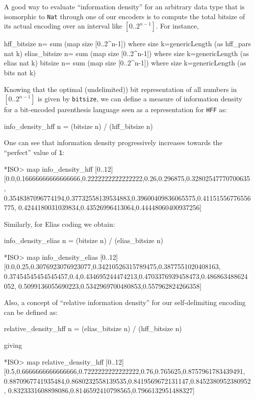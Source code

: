 \documentclass[]{INCLUDES/llncs}
\begin{document}
A good way to evaluate ``information density'' for an arbitrary
data type that is isomorphic to {\tt Nat} through one of our encoders
is to compute the total bitsize of its actual encoding over an
interval like $[0..2^{n-1}]$. For instance,
\begin{code}
hff_bitsize n= sum (map size [0..2^n-1]) where
   size k=genericLength (as hff_pars nat k) 
elias_bitsize n= sum (map size [0..2^n-1]) where
   size k=genericLength (as elias nat k)    
bitsize n= sum (map size [0..2^n-1]) where
   size k=genericLength (as bits nat k)    
\end{code}
Knowing that the optimal (undelimited)) bit representation of all numbers in
$[0..2^{n-1}]$ is given by {\tt bitsize}, we can define a measure of information
density for a bit-encoded parenthesis language seen as a representation for {\tt HFF} as:
\begin{code}
info_density_hff n = (bitsize n) / (hff_bitsize n)
\end{code}
One can see that information density progressively increases towards the
``perfect'' value of {\tt 1}:
\begin{codex}
*ISO> map info_density_hff [0..12]
[0.0,0.16666666666666666,0.2222222222222222,0.26,0.296875,0.32802547770700635,
0.3548387096774194,0.37732558139534883,0.39600409836065575,0.41151556776556775,
0.4244180031039834,0.43526996413064,0.44448060400937256]
\end{codex}
Similarly, for Elias coding we obtain:
\begin{code}
info_density_elias n = (bitsize n) / (elias_bitsize n)
\end{code}
\begin{codex}
*ISO> map info_density_elias [0..12]
[0.0,0.25,0.3076923076923077,0.34210526315789475,0.3877551020408163,
 0.37454545454545457,0.4,0.434695244474213,0.4703376939458473,0.486863488624052,
 0.5099136055690223,0.5342969700480853,0.557962824266358]
\end{codex}
Also, a concept of ``relative information density'' for our
self-delimiting encoding can be defined as:
\begin{code}
relative_density_hff n = (elias_bitsize n) / (hff_bitsize n)
\end{code}
giving
\begin{codex}
*ISO> map relative_density_hff [0..12]
[0.5,0.6666666666666666,0.7222222222222222,0.76,0.765625,0.8757961783439491,
 0.8870967741935484,0.8680232558139535,0.8419569672131147,0.8452380952380952,
 0.8323331608898086,0.8146592410798565,0.7966132951488327]
\end{codex}
\end{document}
